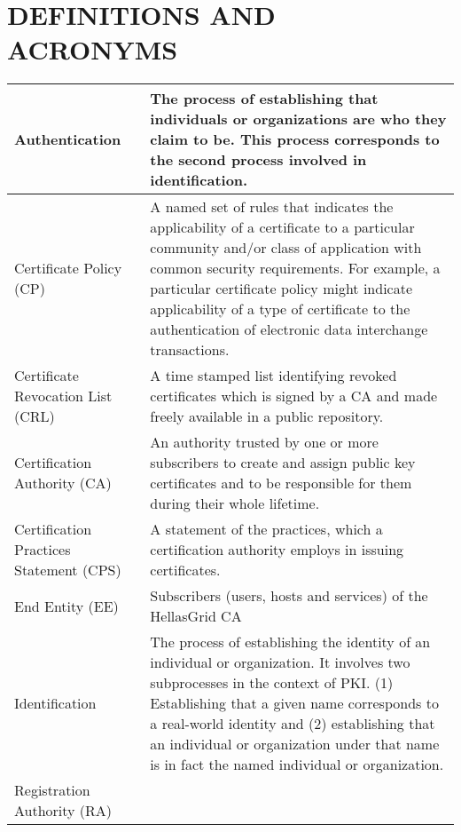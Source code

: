 \newpage

\section{DEFINITIONS AND ACRONYMS}


\begin{tabular}{|p{}|p{}|}

\hline
Authentication & 
The process of establishing that individuals or organizations are who they claim to be. This process corresponds to the second process involved in identification. \\
\hline
Certificate Policy (CP) &
A named set of rules that indicates the applicability of a certificate to a particular community and/or class of application with common security requirements. For example, a particular certificate policy might indicate applicability of a type of certificate to the authentication of electronic data interchange transactions. \\
\hline
Certificate Revocation List (CRL) &
A time stamped list identifying revoked certificates which is signed by a CA and made freely available in a public repository. \\
\hline
Certification Authority (CA) &
An authority trusted by one or more subscribers to create and assign public key certificates and to be responsible for them during their whole lifetime. \\
\hline
Certification Practices Statement (CPS) &
A statement of the practices, which a certification authority employs in issuing certificates. \\
\hline
End Entity (EE) & 
Subscribers (users, hosts and services) of the HellasGrid CA \\
\hline
Identification & 
The process of establishing the identity of an individual or organization. It involves two subprocesses in the context of PKI. (1) Establishing that a given name corresponds to a real-world identity and (2) establishing that an individual or organization under that name is in fact the named individual or organization. \\
\hline
Registration Authority (RA) & 

\end{tabular}
